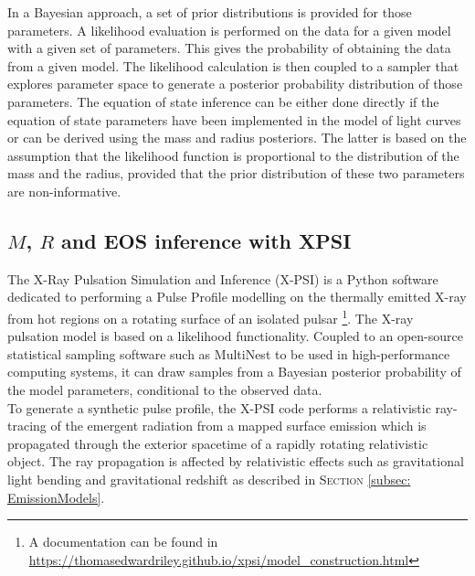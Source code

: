 \documentclass[a4paper, twoside, 12pt]{article}
\numberwithin{equation}{section}
\begin{document}
In a Bayesian approach,  a set of prior distributions is provided for those parameters. A likelihood evaluation is performed on the data for a given model with a given set of parameters. This gives the probability of obtaining the data from a given model.  The likelihood calculation is then coupled to a sampler that explores parameter space to generate a posterior probability distribution of those parameters. The equation of state inference can be either done directly if the equation of state parameters have been implemented in the model of light curves or can be derived using the mass and radius posteriors. The latter is based on the assumption that the likelihood function is proportional to the distribution of the mass and the radius, provided that the prior distribution of these two parameters are non-informative.
 


\subsection{$M$, $R$ and EOS inference with XPSI }
\label{subsec: XPSI}
\hspace{\parindent}	 The  X-Ray Pulsation Simulation and Inference (X-PSI) is a Python software dedicated to performing a Pulse Profile modelling on the thermally emitted X-ray from hot regions on a rotating surface of an isolated pulsar \footnote{A documentation can be found in \url{https://thomasedwardriley.github.io/xpsi/model_construction.html}}.
The X-ray pulsation model is based on a likelihood functionality. Coupled to an open-source statistical sampling software such as MultiNest to be used in high-performance computing systems, it can draw samples from a Bayesian posterior probability of the model parameters, conditional to the observed data. \\

To generate a synthetic pulse profile, the X-PSI code performs a relativistic ray-tracing of the emergent radiation from a mapped surface emission which is propagated through the exterior spacetime of a rapidly rotating relativistic object. 
The ray propagation is affected by  relativistic effects such as gravitational light bending and gravitational redshift as described in S\textsc{ection} \ref{subsec: EmissionModels}.\\
\end{document}
